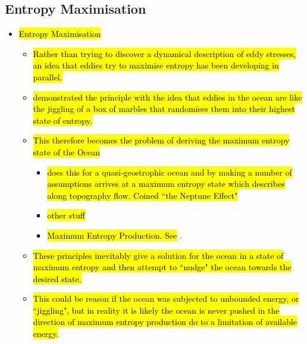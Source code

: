 \documentclass[12pt,a4paper]{report}
\begin{document}
                      \subsection{Entropy  Maximisation}
                      \label{entropy}
                     
                
                \begin{itemize}    
                	
                	\item \hl{Entropy  Maximisation}
                	\begin{itemize}      
                		\item \hl{Rather than trying to discover a dynamical description of eddy stresses, an idea that eddies try to maximise entropy has been developing
                		in parallel.}
                		\item \cite{holloway1987systematic} \hl{demonstrated the principle with the idea that eddies in the ocean are like the jiggling of a box of marbles that randomises them into their highest state of entropy.}
                		\item \hl{This therefore becomes the problem of deriving the maximum
                		entropy state of the Ocean}
                		\begin{itemize}      
                			\item \cite{holloway1992representing} \hl{does this for a
                			 quasi-geostrophic ocean and by making a number of assumptions  
                			 arrives at a maximum entropy state which describes along 
                			 topography flow. Coined ``the Neptune Effect"}
                			\item \hl{other stuff}
                			\item \hl{Maximum Entropy Production. See} \cite{polyakov2001eddy}.
                		\end{itemize}
                		\item \hl{These principles inevitably give a solution for the ocean in 
                		a state of maximum entropy and then attempt to ``nudge" the ocean
                		towards the desired state. }
                		\item \hl{This could be reason if the ocean was subjected to unbounded 
                		energy, or ``jiggling", but in reality it is likely the ocean is never
                		pushed in the direction of maximum entropy production do to
                		a limitation of available energy.}
                	\end{itemize}  
                	
                \end{itemize}
\end{document}
